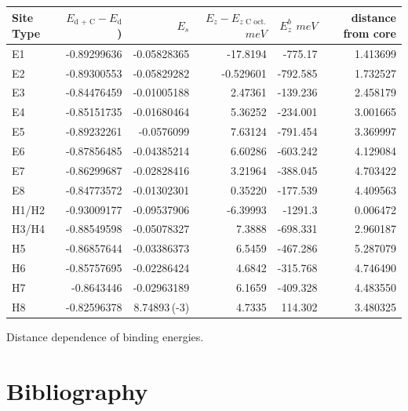 \documentclass[a4paper]{apa6}
\begin{document}
\begin{center}
\begin{tabular}{lrrrrr}
Site Type & \(E_{\text{d + C}} - E_{\text{d}}\)) & \(E_s\) & \(E_z - E_{z\text{ C oct.}}\) \(meV\) & \(E^b_z\) \(meV\) & distance from core\\
\hline
E1 & -0.89299636 & -0.05828365 & -17.8194 & -775.17 & 1.413699\\
E2 & -0.89300553 & -0.05829282 & -0.529601 & -792.585 & 1.732527\\
E3 & -0.84476459 & -0.01005188 & 2.47361 & -139.236 & 2.458179\\
E4 & -0.85151735 & -0.01680464 & 5.36252 & -234.001 & 3.001665\\
E5 & -0.89232261 & -0.0576099 & 7.63124 & -791.454 & 3.369997\\
E6 & -0.87856485 & -0.04385214 & 6.60286 & -603.242 & 4.129084\\
E7 & -0.86299687 & -0.02828416 & 3.21964 & -388.045 & 4.703422\\
E8 & -0.84773572 & -0.01302301 & 0.35220 & -177.539 & 4.409563\\
H1/H2 & -0.93009177 & -0.09537906 & -6.39993 & -1291.3 & 0.006472\\
H3/H4 & -0.88549598 & -0.05078327 & 7.3888 & -698.331 & 2.960187\\
H5 & -0.86857644 & -0.03386373 & 6.5459 & -467.286 & 5.287079\\
H6 & -0.85757695 & -0.02286424 & 4.6842 & -315.768 & 4.746490\\
H7 & -0.8643446 & -0.02963189 & 6.1659 & -409.328 & 4.483550\\
H8 & -0.82596378 & 8.74893\,(-3) & 4.7335 & 114.302 & 3.480325\\
\end{tabular}
\end{center}



Distance dependence of binding energies. 




\section{Bibliography}
\label{sec:org0595511}
\label{org172d722}



\end{document}
